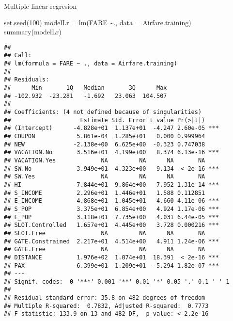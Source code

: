 \documentclass[]{article}
\newenvironment{Shaded}{\begin{snugshade}}{\end{snugshade}}
\newcommand{\AttributeTok}[1]{\textcolor[rgb]{0.77,0.63,0.00}{#1}}
\newcommand{\DecValTok}[1]{\textcolor[rgb]{0.00,0.00,0.81}{#1}}
\newcommand{\FunctionTok}[1]{\textcolor[rgb]{0.00,0.00,0.00}{#1}}
\newcommand{\NormalTok}[1]{#1}
\newcommand{\OtherTok}[1]{\textcolor[rgb]{0.56,0.35,0.01}{#1}}
\newcommand{\SpecialCharTok}[1]{\textcolor[rgb]{0.00,0.00,0.00}{#1}}
\begin{document}
Multiple linear regresion

\begin{Shaded}
\begin{Highlighting}[]
\FunctionTok{set.seed}\NormalTok{(}\DecValTok{100}\NormalTok{)}
\NormalTok{modelLr }\OtherTok{=} \FunctionTok{lm}\NormalTok{(FARE }\SpecialCharTok{\textasciitilde{}}\NormalTok{., }\AttributeTok{data =}\NormalTok{ Airfare.training)}
\FunctionTok{summary}\NormalTok{(modelLr)}
\end{Highlighting}
\end{Shaded}

\begin{verbatim}
## 
## Call:
## lm(formula = FARE ~ ., data = Airfare.training)
## 
## Residuals:
##      Min       1Q   Median       3Q      Max 
## -102.932  -23.281   -1.692   23.063  104.507 
## 
## Coefficients: (4 not defined because of singularities)
##                    Estimate Std. Error t value Pr(>|t|)    
## (Intercept)      -4.828e+01  1.137e+01  -4.247 2.60e-05 ***
## COUPON            5.861e-04  1.285e+01   0.000 0.999964    
## NEW              -2.138e+00  6.625e+00  -0.323 0.747038    
## VACATION.No       3.516e+01  4.199e+00   8.374 6.13e-16 ***
## VACATION.Yes             NA         NA      NA       NA    
## SW.No             3.949e+01  4.323e+00   9.134  < 2e-16 ***
## SW.Yes                   NA         NA      NA       NA    
## HI                7.844e+01  9.864e+00   7.952 1.31e-14 ***
## S_INCOME          2.296e+01  1.446e+01   1.588 0.112851    
## E_INCOME          4.868e+01  1.045e+01   4.660 4.11e-06 ***
## S_POP             3.375e+01  6.854e+00   4.924 1.17e-06 ***
## E_POP             3.118e+01  7.735e+00   4.031 6.44e-05 ***
## SLOT.Controlled   1.657e+01  4.445e+00   3.728 0.000216 ***
## SLOT.Free                NA         NA      NA       NA    
## GATE.Constrained  2.217e+01  4.514e+00   4.911 1.24e-06 ***
## GATE.Free                NA         NA      NA       NA    
## DISTANCE          1.976e+02  1.074e+01  18.391  < 2e-16 ***
## PAX              -6.399e+01  1.209e+01  -5.294 1.82e-07 ***
## ---
## Signif. codes:  0 '***' 0.001 '**' 0.01 '*' 0.05 '.' 0.1 ' ' 1
## 
## Residual standard error: 35.8 on 482 degrees of freedom
## Multiple R-squared:  0.7832, Adjusted R-squared:  0.7773 
## F-statistic: 133.9 on 13 and 482 DF,  p-value: < 2.2e-16
\end{verbatim}
\end{document}
